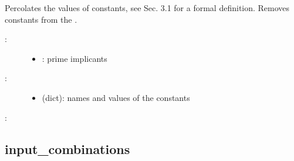 \documentclass[letterpaper,10pt,english]{sphinxmanual}
\begin{document}
\begin{fulllineitems}
\label{\detokenize{PrimeImplicants:PyBoolNet.PrimeImplicants.percolate_and_remove_constants}}
Percolates the values of constants, see {\hyperref[\detokenize{Bibliography:klarner2015approx}]{}} Sec. 3.1 for a formal definition.
Removes constants from the .
\begin{description}
\item[{:}] \leavevmode\begin{itemize}
\item {} 
: prime implicants

\end{itemize}

\item[{:}] \leavevmode\begin{itemize}
\item {} 
 (dict): names and values of the constants

\end{itemize}

\end{description}

:

\begin{sphinxVerbatim}[commandchars=\\\{\}]
  
\end{sphinxVerbatim}

\end{fulllineitems}



\subsection{input\_combinations}
\label{\detokenize{PrimeImplicants:input-combinations}}\label{\detokenize{PrimeImplicants:id16}}
\end{document}
